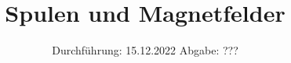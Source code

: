 

\subject{v308}
\title{Spulen und Magnetfelder}
\date{
  Durchführung: 15.12.2022
  \hspace{3em}
  Abgabe: ???
}



\maketitle
\thispagestyle{empty}
\tableofcontents
\newpage





\newpage
\printbibliography{}
\nocite{matplotlib}
\nocite{numpy}
\nocite{scipy}
\nocite{uncertainties}
\nocite{reback2020pandas}

\newpage



